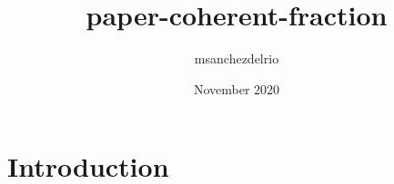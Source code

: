 \documentclass{article}
\title{paper-coherent-fraction}
\author{msanchezdelrio }
\date{November 2020}
\begin{document}
\maketitle

\section{Introduction}
\end{document}
